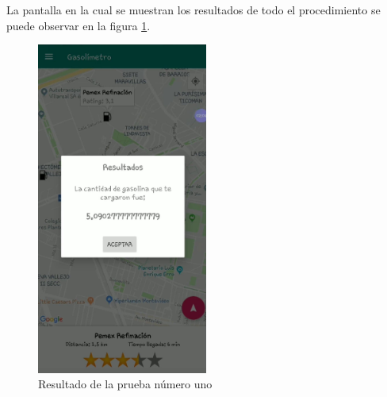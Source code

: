 La pantalla en la cual se muestran los resultados de todo el procedimiento se puede observar en la figura \ref{fig:prueba_integracion}.
\begin{figure}[H]
	\centering
	\includegraphics[width=0.5\textwidth]{Capitulo6/integracion/Hardware/img/pantalla_combustible}
	\caption{Resultado de la prueba número uno}
	\label{fig:prueba_integracion}
\end{figure}
